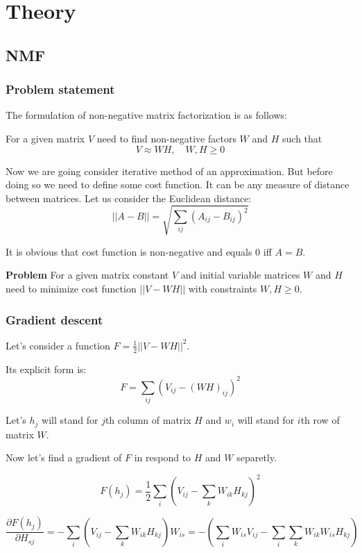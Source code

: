 \documentclass{extreport}
\begin{document}
\section{Theory}

\subsection{NMF}

\subsubsection{Problem statement}

The formulation of non-negative matrix factorization is as follows:

For a given matrix $V$ need to find non-negative factors $W$ and $H$
such that
\[
  V \approx WH, \quad W,H \geqslant 0
\]

Now we are going consider iterative method of an approximation.
But before doing so we need to define some cost function.
It can be any measure of distance between matrices.
Let us consider the Euclidean distance:
\[
  ||A - B|| = \sqrt{\sum_{ij} (A_{ij} - B_{ij})^2}
\]

It is obvious that cost function is non-negative
and equals 0 iff $A = B$.

\textbf{Problem} For a given matrix constant $V$
and initial variable matrices $W$ and $H$
need to minimize cost function $||V - WH||$ with constraints
$W,H \geqslant 0$.

\subsubsection{Gradient descent}
Let's consider a function $F = \frac{1}{2}||V - WH||^2$.

Its explicit form is:
\[
  F = \sum_{ij}
  \left(
    V_{ij} - (WH)_{ij}
  \right)^2
\]

Let's $h_j$ will stand for $j$th column of matrix $H$
and $w_i$ will stand for $i$th row of matrix $W$.

Now let's find a gradient of $F$ in respond to $H$ and $W$ separetly.

\[
  F(h_j) = \frac{1}{2} \sum_{i}
  \left(
    V_{ij} - \sum_{k}W_{ik}H_{kj}
  \right)^2
\]

\[
  \frac{\partial F(h_j)}{\partial H_{sj}} =
  - \sum_i
    \left(
      V_{ij} - \sum_k W_{ik}H_{kj}
    \right)
  W_{is} =
  -
    \left(
      \sum_i W_{is}V_{ij} - \sum_i\sum_kW_{ik}W_{is}H_{kj}
    \right)
\]
\end{document}
